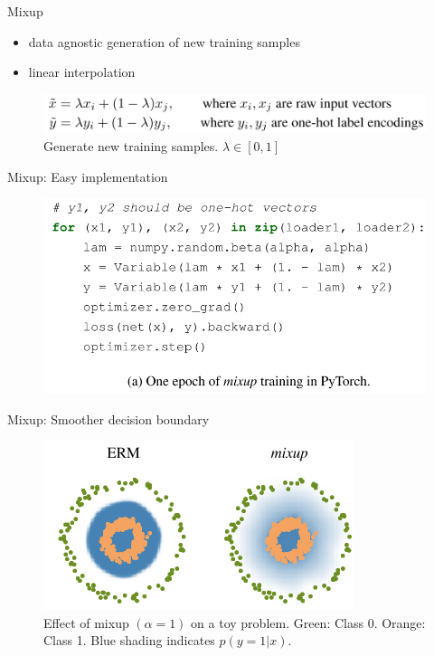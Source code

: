 \documentclass{beamer}
\begin{document}
\begin{frame}{Mixup}

\begin{itemize}
\item data agnostic generation of new training samples
\item linear interpolation
\end{itemize}

\begin{figure}[h]
\includegraphics[width=\textwidth]{img/samples}
\caption{Generate new training samples. $\lambda \in [0,1]$}
\end{figure}

\end{frame}
\begin{frame}{Mixup: Easy implementation}

\begin{figure}[h]
\includegraphics[width=\textwidth]{img/code}

\end{figure}

\end{frame}
\begin{frame}{Mixup: Smoother decision boundary}

\begin{figure}[h]
\includegraphics[width=\textwidth]{img/example}
\caption{Effect of mixup $(\alpha = 1)$ on a
toy problem. Green: Class 0. Orange: Class 1. Blue shading indicates $p(y = 1|x)$.}
\end{figure}

\end{frame}
\end{document}
